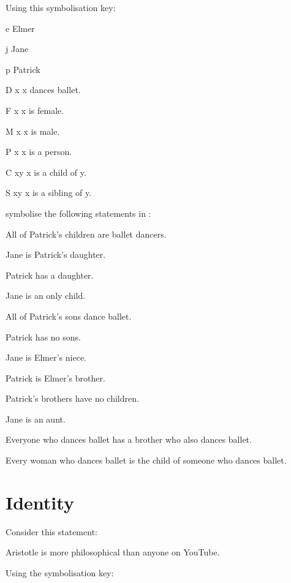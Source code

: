 \documentclass[PHIL101-Textbook.tex]{subfiles}
\begin{document}
\noindent\solutions
\problempart
\label{pr.plballet}
Using this symbolisation key:
\begin{ekey}
\item[e] Elmer
\item[j] Jane
\item[p] Patrick
\item[\atom D x ] x dances ballet.
\item[\atom F x ] x is female.
\item[\atom M x ] x is male.
\item[\atom P x ] x is a person. 
\item[\atom C xy ] x is a child of y.
\item[\atom S xy ] x is a sibling of y.
\end{ekey}
symbolise the following statements in \pl:
\begin{earg}
\item All of Patrick's children are ballet dancers.
\item Jane is Patrick's daughter.
\item Patrick has a daughter.
\item Jane is an only child.
\item All of Patrick's sons dance ballet.
\item Patrick has no sons.
\item Jane is Elmer's niece.
\item Patrick is Elmer's brother.
\item Patrick's brothers have no children.
\item Jane is an aunt.
\item Everyone who dances ballet has a brother who also dances ballet.
\item Every woman who dances ballet is the child of someone who dances ballet.
\end{earg}


\chapter{Identity}
\label{ch:identity}

Consider this statement:
\begin{earg}
\item[\ex{else1}] Aristotle is more philosophical than anyone on YouTube. 
\end{earg}
Using the symbolisation key:
\end{document}

